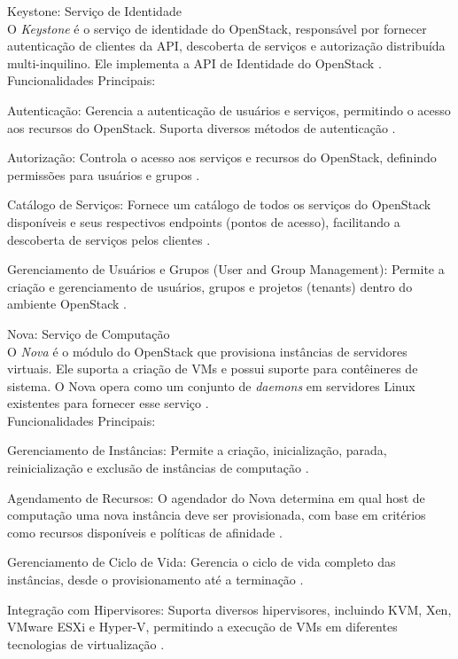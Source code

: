 \begin{description}
    \item Keystone: Serviço de Identidade\\
    O \textit{Keystone} é o serviço de identidade do OpenStack, responsável por fornecer autenticação de clientes da API, descoberta de serviços e autorização distribuída multi-inquilino. Ele implementa a API de Identidade do OpenStack \cite{openstackkeystone}.\\
    Funcionalidades Principais:
    \begin{description}
        \item Autenticação: Gerencia a autenticação de usuários e serviços, permitindo o acesso aos recursos do OpenStack. Suporta diversos métodos de autenticação \cite{openstackkeystone}.
        \item Autorização: Controla o acesso aos serviços e recursos do OpenStack, definindo permissões para usuários e grupos \cite{openstackkeystone}.
        \item Catálogo de Serviços: Fornece um catálogo de todos os serviços do OpenStack disponíveis e seus respectivos endpoints (pontos de acesso), facilitando a descoberta de serviços pelos clientes \cite{openstackkeystone}.
        \item Gerenciamento de Usuários e Grupos (User and Group Management): Permite a criação e gerenciamento de usuários, grupos e projetos (tenants) dentro do ambiente OpenStack \cite{openstackkeystone}.
    \end{description}

    \item Nova: Serviço de Computação\\
    O \textit{Nova} é o módulo do OpenStack que provisiona instâncias de servidores virtuais. Ele suporta a criação de VMs e possui suporte para contêineres de sistema. O Nova opera como um conjunto de \textit{daemons} em servidores Linux existentes para fornecer esse serviço \cite{openstacknova}.\\
    Funcionalidades Principais:
    \begin{description}
        \item Gerenciamento de Instâncias: Permite a criação, inicialização, parada, reinicialização e exclusão de instâncias de computação \cite{openstacknova}.
        \item Agendamento de Recursos: O agendador do Nova determina em qual host de computação uma nova instância deve ser provisionada, com base em critérios como recursos disponíveis e políticas de afinidade \cite{openstacknova}.
        \item Gerenciamento de Ciclo de Vida: Gerencia o ciclo de vida completo das instâncias, desde o provisionamento até a terminação \cite{openstacknova}.
        \item Integração com Hipervisores: Suporta diversos hipervisores, incluindo KVM, Xen, VMware ESXi e Hyper-V, permitindo a execução de VMs em diferentes tecnologias de virtualização \cite{openstacknova}.
    \end{description}


\end{description}
